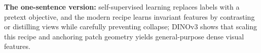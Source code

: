 \begin{InsightBox}
\textbf{The one-sentence version:} self-supervised learning replaces labels with a pretext objective, and the modern recipe learns invariant features by contrasting or distilling views while carefully preventing collapse; DINOv3 shows that scaling this recipe and anchoring patch geometry yields general-purpose dense visual features.
\end{InsightBox}
